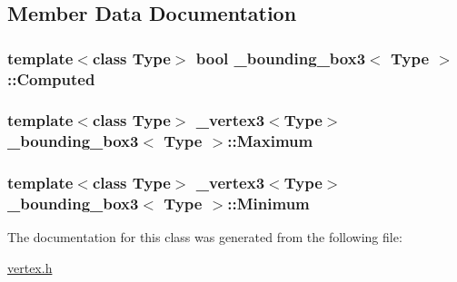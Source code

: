 \subsection{Member Data Documentation}
\hypertarget{class__bounding__box3_a8d7cdcc5b4a4085daf665bf47736aeef}{
\subsubsection[{Computed}]{\setlength{\rightskip}{0pt plus 5cm}template$<$class Type$>$ bool {\bf \+\_\+bounding\+\_\+box3}$<$ Type $>$\+::Computed}}\label{class__bounding__box3_a8d7cdcc5b4a4085daf665bf47736aeef}
\hypertarget{class__bounding__box3_a5bf3722c3b79e215f82f076640f4df3d}{
\subsubsection[{Maximum}]{\setlength{\rightskip}{0pt plus 5cm}template$<$class Type$>$ {\bf \+\_\+vertex3}$<$Type$>$ {\bf \+\_\+bounding\+\_\+box3}$<$ Type $>$\+::Maximum}}\label{class__bounding__box3_a5bf3722c3b79e215f82f076640f4df3d}
\hypertarget{class__bounding__box3_af704e0ab2dad13b41f7eda1e55b9765e}{
\subsubsection[{Minimum}]{\setlength{\rightskip}{0pt plus 5cm}template$<$class Type$>$ {\bf \+\_\+vertex3}$<$Type$>$ {\bf \+\_\+bounding\+\_\+box3}$<$ Type $>$\+::Minimum}}\label{class__bounding__box3_af704e0ab2dad13b41f7eda1e55b9765e}


The documentation for this class was generated from the following file\+:\begin{DoxyCompactItemize}
\item 
\hyperlink{vertex_8h}{vertex.\+h}\end{DoxyCompactItemize}
